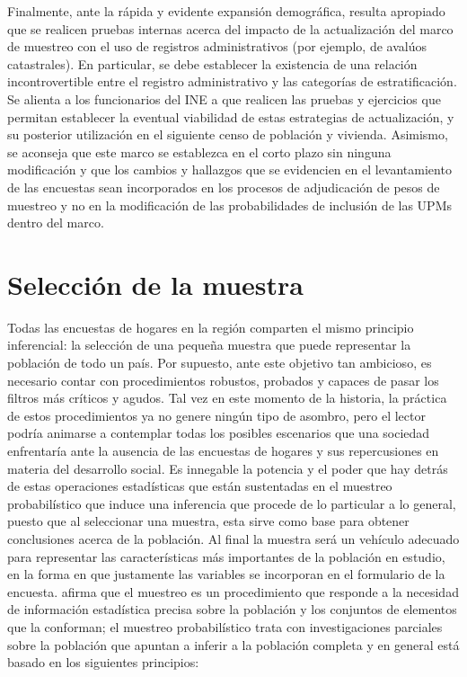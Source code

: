 \documentclass[12pt,spanish,]{book}
\begin{document}
Finalmente, ante la rápida y evidente expansión demográfica, resulta apropiado que se realicen pruebas internas acerca del impacto de la actualización del marco de muestreo con el uso de registros administrativos (por ejemplo, de avalúos catastrales). En particular, se debe establecer la existencia de una relación incontrovertible entre el registro administrativo y las categorías de estratificación. Se alienta a los funcionarios del INE a que realicen las pruebas y ejercicios que permitan establecer la eventual viabilidad de estas estrategias de actualización, y su posterior utilización en el siguiente censo de población y vivienda. Asimismo, se aconseja que este marco se establezca en el corto plazo sin ninguna modificación y que los cambios y hallazgos que se evidencien en el levantamiento de las encuestas sean incorporados en los procesos de adjudicación de pesos de muestreo y no en la modificación de las probabilidades de inclusión de las UPMs dentro del marco.

\hypertarget{seleccion-de-la-muestra}{%
\chapter{Selección de la muestra}\label{seleccion-de-la-muestra}}

Todas las encuestas de hogares en la región comparten el mismo principio inferencial: la selección de una pequeña muestra que puede representar la población de todo un país. Por supuesto, ante este objetivo tan ambicioso, es necesario contar con procedimientos robustos, probados y capaces de pasar los filtros más críticos y agudos. Tal vez en este momento de la historia, la práctica de estos procedimientos ya no genere ningún tipo de asombro, pero el lector podría animarse a contemplar todas los posibles escenarios que una sociedad enfrentaría ante la ausencia de las encuestas de hogares y sus repercusiones en materia del desarrollo social. Es innegable la potencia y el poder que hay detrás de estas operaciones estadísticas que están sustentadas en el muestreo probabilístico que induce una inferencia que procede de lo particular a lo general, puesto que al seleccionar una muestra, esta sirve como base para obtener conclusiones acerca de la población. Al final la muestra será un vehículo adecuado para representar las características más importantes de la población en estudio, en la forma en que justamente las variables se incorporan en el formulario de la encuesta. \textcite{Gutierrez_2016} afirma que el muestreo es un procedimiento que responde a la necesidad de información estadística precisa sobre la población y los conjuntos de elementos que la conforman; el muestreo probabilístico trata con investigaciones parciales sobre la población que apuntan a inferir a la población completa y en general está basado en los siguientes principios:
\end{document}
